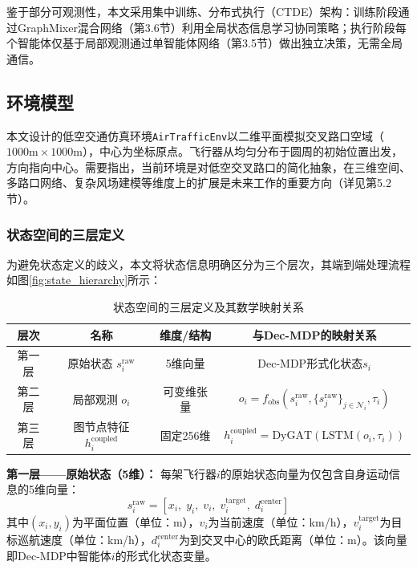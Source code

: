 \documentclass[12pt,a4paper,UTF8]{ctexart}
\begin{document}
鉴于部分可观测性，本文采用集中训练、分布式执行（CTDE）架构：训练阶段通过GraphMixer混合网络（第3.6节）利用全局状态信息学习协同策略；执行阶段每个智能体仅基于局部观测通过单智能体网络（第3.5节）做出独立决策，无需全局通信。

\subsection{环境模型}

本文设计的低空交通仿真环境\texttt{AirTrafficEnv}以二维平面模拟交叉路口空域（$1000\text{m} \times 1000\text{m}$），中心为坐标原点。飞行器从均匀分布于圆周的初始位置出发，方向指向中心。需要指出，当前环境是对低空交叉路口的简化抽象，在三维空间、多路口网络、复杂风场建模等维度上的扩展是未来工作的重要方向（详见第5.2节）。

\subsubsection{状态空间的三层定义}

为避免状态定义的歧义，本文将状态信息明确区分为三个层次，其端到端处理流程如图\ref{fig:state_hierarchy}所示：

\begin{table}[H]
    \centering
    \caption{状态空间的三层定义及其数学映射关系}
    \label{tab:state_layers}
    \begin{tabular}{|c|c|c|c|}
        \hline
        \textbf{层次} & \textbf{名称} & \textbf{维度/结构} & \textbf{与Dec-MDP的映射关系} \\
        \hline
        第一层 & 原始状态 $s_i^{\text{raw}}$ & 5维向量 & Dec-MDP形式化状态$s_i$ \\
        \hline
        第二层 & 局部观测 $o_i$ & 可变维张量 & $o_i = f_{\text{obs}}(s_i^{\text{raw}}, \{s_j^{\text{raw}}\}_{j \in \mathcal{N}_i}, \tau_i)$ \\
        \hline
        第三层 & 图节点特征 $h_i^{\text{coupled}}$ & 固定256维 & $h_i^{\text{coupled}} = \text{DyGAT}(\text{LSTM}(o_i, \tau_i))$ \\
        \hline
    \end{tabular}
\end{table}

\textbf{第一层——原始状态（5维）：}
每架飞行器$i$的原始状态向量为仅包含自身运动信息的5维向量：
\begin{equation}
    s_i^{\text{raw}} = [x_i,\; y_i,\; v_i,\; v_i^{\text{target}},\; d_i^{\text{center}}]
    \label{eq:raw_state}
\end{equation}
其中$(x_i, y_i)$为平面位置（单位：m），$v_i$为当前速度（单位：km/h），$v_i^{\text{target}}$为目标巡航速度（单位：km/h），$d_i^{\text{center}}$为到交叉中心的欧氏距离（单位：m）。该向量即Dec-MDP中智能体$i$的形式化状态变量。
\end{document}
